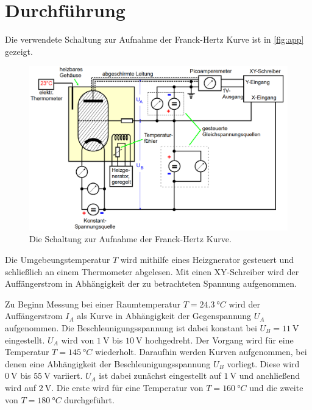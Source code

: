 \section{Durchführung}
\label{sec:durchführung}
Die verwendete Schaltung zur Aufnahme der Franck-Hertz Kurve ist in \autoref{fig:app} gezeigt.
\begin{figure}[H]
	\centering
	\includegraphics[width=0.75\linewidth]{content/grafik/apperatur.png}
	\caption{Die Schaltung zur Aufnahme der Franck-Hertz Kurve. \cite{franck}}
	\label{fig:app}
\end{figure}
Die Umgebeungstemperatur $T$ wird mithilfe eines Heizgnerator gesteuert und schließlich an einem 
Thermometer abgelesen. Mit einen XY-Schreiber wird  der Auffängerstrom in Abhängigkeit der zu betrachteten Spannung aufgenommen.

Zu Beginn Messung bei einer Raumtemperatur $T =\qty{24.3}{°C}$ wird der Auffängerstrom $I_A$ als Kurve in Abhängigkeit der Gegenspannung $U_A$ aufgenommen.
Die Beschleunigungsspannung ist dabei konstant bei $ U_B = \SI{11}{\volt}$ eingestellt. $U_A$ wird von $\SI{1}{\volt}$ bis $\SI{10}{\volt}$ hochgedreht.
Der Vorgang wird für eine Temperatur $T =\qty{145}{°C}$ wiederholt. Daraufhin werden Kurven aufgenommen, bei denen eine Abhängigkeit der Beschleunigungsspannung $U_B$
vorliegt. Diese wird $\SI{0}{\volt}$ bis $\SI{55}{\volt}$ variiert. $U_A$ ist dabei zunächst eingestellt auf $\SI{1}{\volt}$ und anchließend wird auf $\SI{2}{\volt}$.
Die erste wird für eine Temperatur von $T = \qty{160}{°C}$ und die zweite von $T = \qty{180}{°C}$ durchgeführt.
